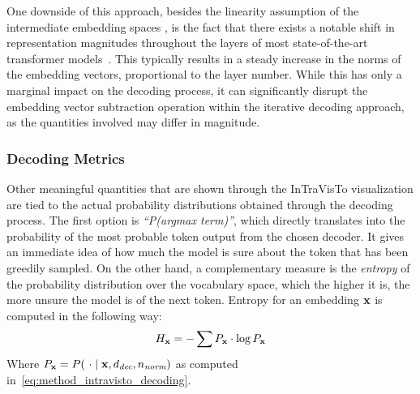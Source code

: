 One downside of this approach, besides the linearity assumption of the intermediate embedding spaces , is the fact that there exists a notable shift in representation magnitudes throughout the layers of most state-of-the-art transformer models~\cite{heimersheim2023}.
This typically results in a steady increase in the norms of the embedding vectors, proportional to the layer number.
While this has only a marginal impact on the decoding process, it can significantly disrupt the embedding vector subtraction operation within the iterative decoding approach, as the quantities involved may differ in magnitude.

\subsubsection{Decoding Metrics}\label{sssec:method_intravisto_decoding_metrics}

Other meaningful quantities that are shown through the InTraVisTo visualization are tied to the actual probability distributions obtained through the decoding process.
The first option is \emph{``P(argmax term)''}, which directly translates into the probability of the most probable token output from the chosen decoder. %
It gives an immediate idea of how much the model is sure about the token that has been greedily sampled.
On the other hand, a complementary measure is the \emph{entropy} of the probability distribution over the vocabulary space, which the higher it is, the more unsure the model is of the next token.
Entropy for an embedding $\bm{\mathbf{x}}$ is computed in the following way:
\begin{equation*}
    \label{eq:method_intravisto_entropy}
    H_{\bm{\mathbf{x}}} = -\sum{P_{\bm{\mathbf{x}}} \cdot \log{P_{\bm{\mathbf{x}}}}}
\end{equation*}
Where $P_{\bm{\mathbf{x}}} = P(\ \cdot \mid \bm{\mathbf{x}}, d_\textit{dec}, n_\textit{norm})$ as computed in~\cref{eq:method_intravisto_decoding}.

